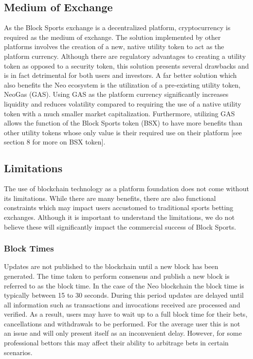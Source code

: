 \documentclass{article}
\begin{document}
	\subsection{Medium of Exchange}
As the Block Sports exchange is a decentralized platform, cryptocurrency is required as the medium of exchange. The solution implemented by other platforms involves the creation of a new, native utility token to act as the platform currency. Although there are regulatory advantages to creating a utility token as opposed to a security token, this solution presents several drawbacks and is in fact detrimental for both users and investors. A far better solution which also benefits the Neo ecosystem is the utilization of a pre-existing utility token, NeoGas (GAS). Using GAS as the platform currency significantly increases liquidity and reduces volatility compared to requiring the use of a native utility token with a much smaller market capitalization. Furthermore, utilizing GAS allows the function of the Block Sports token (BSX) to have more benefits than other utility tokens whose only value is their required use on their platform [see section 8 for more on BSX token].

	\subsection{Limitations}
The use of blockchain technology as a platform foundation does not come without its limitations. While there are many benefits, there are also functional constraints which may impact users accustomed to traditional sports betting exchanges. Although it is important to understand the limitations, we do not believe these will significantly impact the commercial success of Block Sports.

		\subsubsection{Block Times}
Updates are not published to the blockchain until a new block has been generated. The time taken to perform consensus and publish a new block is referred to as the block time. In the case of the Neo blockchain the block time is typically between 15 to 30 seconds. During this period updates are delayed until all information such as transactions and invocations received are processed and verified. As a result, users may have to wait up to a full block time for their bets, cancellations and withdrawals to be performed. For the average user this is not an issue and will only present itself as an inconvenient delay. However, for some professional bettors this may affect their ability to arbitrage bets in certain scenarios.
\end{document}
